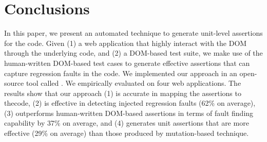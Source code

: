 \section{Conclusions} \label{Sec:concs}
In this paper, we present an automated technique to generate unit-level assertions for the \javascript code. Given (1) a web application that highly interact with the DOM through the underlying \javascript code, and (2) a DOM-based test suite, we make use of the human-written DOM-based test cases to generate effective assertions that can capture regression faults in the \javascript code. We implemented our approach in an open-source tool called \tool. We empirically evaluated \tool on four web applications. The results show that our approach (1) is accurate in mapping the assertions to the\javascript code, (2) is effective in detecting injected regression faults (62\% on average), (3) outperforms human-written DOM-based assertions in terms of fault finding capability by 37\% on average, and (4) generates unit assertions that are more effective (29\% on average) than those produced by mutation-based technique.
